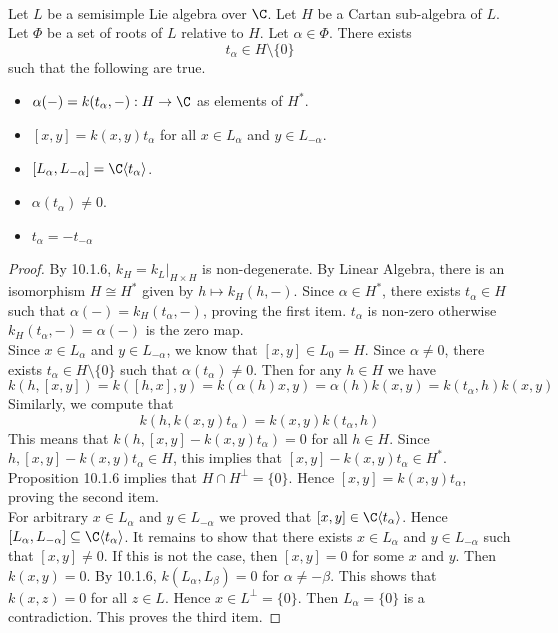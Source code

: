 \documentclass[a4paper]{article}
\begin{document}
\begin{lmm}{}{} \\Let $L$ be a semisimple Lie algebra over $\C$. Let $H$ be a Cartan sub-algebra of $L$. Let $\Phi$ be a set of roots of $L$ relative to $H$. Let $\alpha\in\Phi$. There exists $$t_\alpha\in H\setminus\{0\}$$ such that the following are true. 
\begin{itemize}
\item $\alpha(-)=k(t_\alpha,-):H\to\C$ as elements of $H^\ast$. 
\item $[x,y]=k(x,y)t_\alpha$ for all $x\in L_\alpha$ and $y\in L_{-\alpha}$. 
\item $[L_\alpha,L_{-\alpha}]=\C\langle t_\alpha\rangle$. 
\item $\alpha(t_\alpha)\neq 0$. 
\item $t_\alpha=-t_{-\alpha}$
\end{itemize} 
\begin{proof}
By 10.1.6, $k_H=k_L|_{H\times H}$ is non-degenerate. By Linear Algebra, there is an isomorphism $H\cong H^\ast$ given by $h\mapsto k_H(h,-)$. Since $\alpha\in H^\ast$, there exists $t_\alpha\in H$ such that $\alpha(-)=k_H(t_\alpha,-)$, proving the first item. $t_\alpha$ is non-zero otherwise $k_H(t_\alpha,-)=\alpha(-)$ is the zero map. \\

Since $x\in L_\alpha$ and $y\in L_{-\alpha}$, we know that $[x,y]\in L_0=H$. Since $\alpha\neq 0$, there exists $t_\alpha\in H\setminus\{0\}$ such that $\alpha(t_\alpha)\neq 0$. Then for any $h\in H$ we have $$k(h,[x,y])=k([h,x],y)=k(\alpha(h)x,y)=\alpha(h)k(x,y)=k(t_\alpha,h)k(x,y)$$ Similarly, we compute that $$k(h,k(x,y)t_\alpha)=k(x,y)k(t_\alpha,h)$$ This means that $k(h,[x,y]-k(x,y)t_\alpha)=0$ for all $h\in H$. Since $h,[x,y]-k(x,y)t_\alpha\in H$, this implies that $[x,y]-k(x,y)t_\alpha\in H^\ast$. Proposition 10.1.6 implies that $H\cap H^\perp=\{0\}$. Hence $[x,y]=k(x,y)t_\alpha$, proving the second item. \\

For arbitrary $x\in L_\alpha$ and $y\in L_{-\alpha}$ we proved that $[x,y]\in\C\langle t_\alpha\rangle$. Hence $[L_\alpha,L_{-\alpha}]\subseteq\C\langle t_\alpha\rangle$. It remains to show that there exists $x\in L_\alpha$ and $y\in L_{-\alpha}$ such that $[x,y]\neq 0$. If this is not the case, then $[x,y]=0$ for some $x$ and $y$. Then $k(x,y)=0$. By 10.1.6, $k(L_\alpha,L_\beta)=0$ for $\alpha\neq-\beta$. This shows that $k(x,z)=0$ for all $z\in L$. Hence $x\in L^\perp=\{0\}$. Then $L_\alpha=\{0\}$ is a contradiction. This proves the third item. 


\end{proof}
\end{lmm}
\end{document}
